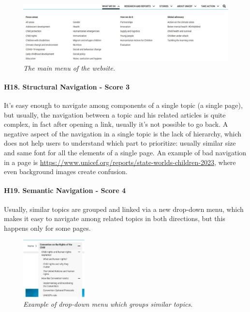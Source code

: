 \begin{figure}[!h]
	\begin{center}
		\includegraphics[width=\textwidth]{FinalScores20.jpg}
		\captionsetup{font=small}
		\caption{\textit{The main menu of the website.}}
	\end{center}
\end{figure}
\newline
\newline \paragraph{H18. Structural Navigation - Score 3}  \label{subsec:H18}	It’s easy enough to navigate among components of a single topic (a single page), but usually, the navigation between a topic and his related articles is quite complex, in fact after opening a link, usually it’s not possible to go back.
\newline A negative aspect of the navigation in a single topic is the lack of hierarchy, which does not help users to understand which part to prioritize: usually similar size and same font for all the elements of a single page.
\newline An example of bad navigation in a page is \href{https://www.unicef.org/reports/state-worlds-children-2023}{https://www.unicef.org/reports/state-worlds-children-2023}, where even background images create confusion.
\newline
\newline \paragraph{H19. Semantic Navigation - Score 4}  \label{subsec:H19}	Usually, similar topics are grouped and linked via a new drop-down menu, which makes it easy to navigate among related topics in both directions, but this happens only for some pages.
\begin{figure}[!h]
	\begin{center}
		\includegraphics[width=0.3\textwidth]{FinalScores21.jpg}
		\captionsetup{font=small}
		\caption{\textit{Example of drop-down menu which groups similar topics.}}
	\end{center}
\end{figure}

